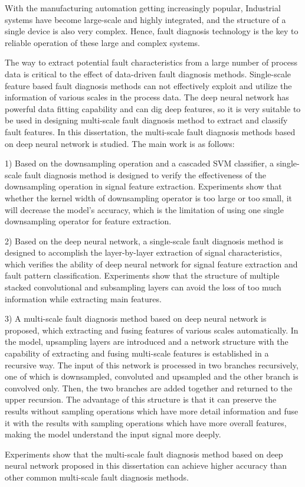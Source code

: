 \begin{eabstract}
  With the manufacturing automation getting increasingly popular,
  Industrial systems have become large-scale and highly integrated,
  and the structure of a single device is also very complex. Hence,
  fault diagnosis technology is the key to reliable operation of
  these large and complex systems.

  The way to extract potential fault characteristics from a large
  number of process data is critical to the effect of data-driven
  fault diagnosis methods. Single-scale feature based fault diagnosis
  methods can not effectively exploit and utilize the information
  of various scales in the process data. The deep neural network
  has powerful data fitting capability and can dig deep features,
  so it is very suitable to be used in designing multi-scale fault
  diagnosis method to extract and classify fault features. In this
  dissertation, the multi-scale fault diagnosis methods based on deep
  neural network is studied. The main work is as follows:

  1) Based on the downsampling operation and a cascaded SVM classifier,
  a single-scale fault diagnosis method is designed to verify the
  effectiveness of the downsampling operation in signal feature extraction.
  Experiments show that whether the kernel width of downsampling operator
  is too large or too small, it will decrease the model's accuracy,
  which is the limitation of using one single downsampling operator
  for feature extraction. 

  2) Based on the deep neural network, a single-scale fault diagnosis
  method is designed to accomplish the layer-by-layer extraction of signal
  characteristics, which verifies the ability of deep neural network
  for signal feature extraction and fault pattern classification. Experiments
  show that the structure of multiple stacked convolutional and subsampling
  layers can avoid the loss of too much information while extracting main features.

  3) A multi-scale fault diagnosis method based on deep neural network is
  proposed, which extracting and fusing features of various scales automatically.
  In the model, upsampling layers are introduced and a network structure
  with the capability of extracting and fusing multi-scale features is
  established in a recursive way. The input of this network is processed
  in two branches recursively, one of which is downsampled, convoluted
  and upsampled and the other branch is convolved only. Then, the two branches
  are added together and returned to the upper recursion. The advantage of
  this structure is that it can preserve the results without sampling operations
  which have more detail information and fuse it with the results with
  sampling operations which have more overall features, making the model
  understand the input signal more deeply.

  Experiments show that the multi-scale fault diagnosis method based on deep
  neural network proposed in this dissertation can achieve higher accuracy
  than other common multi-scale fault diagnosis methods.
\end{eabstract}

